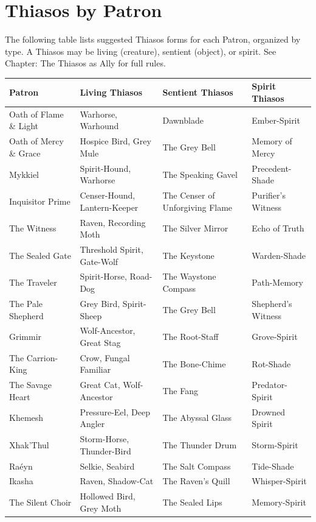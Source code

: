\section{Thiasos by Patron}

The following table lists suggested Thiasos forms for each Patron, organized by type. A Thiasos may be living (creature), sentient (object), or spirit. See Chapter: The Thiasos as Ally for full rules.

\begin{table}[h]
\centering
\small
\begin{tabular}{llll}
\hline
\textbf{Patron} & \textbf{Living Thiasos} & \textbf{Sentient Thiasos} & \textbf{Spirit Thiasos} \\
\hline
Oath of Flame \& Light & Warhorse, Warhound & Dawnblade & Ember-Spirit \\
Oath of Mercy \& Grace & Hospice Bird, Grey Mule & The Grey Bell & Memory of Mercy \\
Mykkiel & Spirit-Hound, Warhorse & The Speaking Gavel & Precedent-Shade \\
Inquisitor Prime & Censer-Hound, Lantern-Keeper & The Censer of Unforgiving Flame & Purifier's Witness \\
The Witness & Raven, Recording Moth & The Silver Mirror & Echo of Truth \\
\hline
The Sealed Gate & Threshold Spirit, Gate-Wolf & The Keystone & Warden-Shade \\
The Traveler & Spirit-Horse, Road-Dog & The Waystone Compass & Path-Memory \\
The Pale Shepherd & Grey Bird, Spirit-Sheep & The Grey Bell & Shepherd's Witness \\
\hline
Grimmir & Wolf-Ancestor, Great Stag & The Root-Staff & Grove-Spirit \\
The Carrion-King & Crow, Fungal Familiar & The Bone-Chime & Rot-Shade \\
The Savage Heart & Great Cat, Wolf-Ancestor & The Fang & Predator-Spirit \\
\hline
Khemesh & Pressure-Eel, Deep Angler & The Abyssal Glass & Drowned Spirit \\
Xhak'Thul & Storm-Horse, Thunder-Bird & The Thunder Drum & Storm-Spirit \\
Raéyn & Selkie, Seabird & The Salt Compass & Tide-Shade \\
\hline
Ikasha & Raven, Shadow-Cat & The Raven's Quill & Whisper-Spirit \\
The Silent Choir & Hollowed Bird, Grey Moth & The Sealed Lips & Memory-Spirit \\

\end{tabular}
\end{table}
